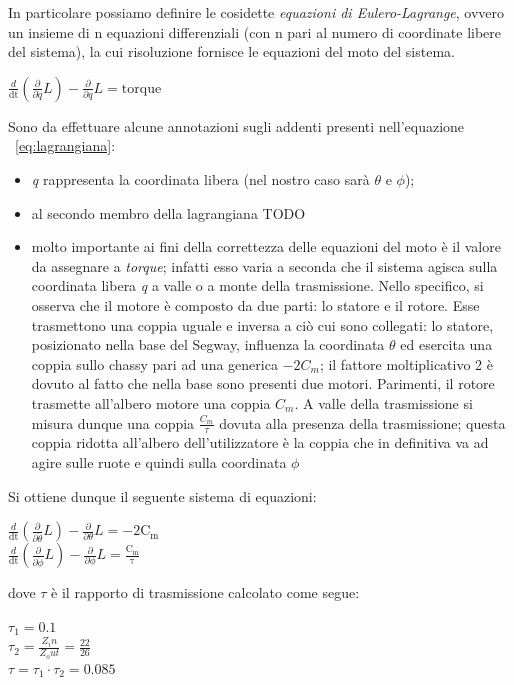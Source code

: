 In particolare possiamo definire le cosidette \textit{equazioni di Eulero-Lagrange}, ovvero un insieme di n equazioni differenziali (con n pari al numero di coordinate libere del sistema), la cui risoluzione fornisce le equazioni del moto del sistema.
\begin{center}
	\label{eq:lagrangiana}
	$\frac{d}{\mathrm{dt}}\left(\frac{\partial }{\partial \dot{q} }L\right)-\frac{\partial }{\partial q}L=\mathrm{torque}\ $
\end{center}

Sono da effettuare alcune annotazioni sugli addenti presenti nell'equazione ~\ref{eq:lagrangiana}:
\begin{itemize}
	\item \textit{q} rappresenta la coordinata libera (nel nostro caso sarà $\theta$ e $\phi$);
	\item al secondo membro della lagrangiana TODO
	\item molto importante ai fini della correttezza delle equazioni  del moto è il valore da assegnare a \textit{torque}; infatti esso varia a seconda che il sistema agisca sulla coordinata libera \textit{q} a valle o a monte della trasmissione.
	Nello specifico, si osserva che il motore è composto da due parti: lo statore e il rotore. Esse trasmettono una coppia uguale e inversa a ciò cui sono collegati: lo statore, posizionato nella base del Segway, influenza la coordinata $\theta$ ed esercita una coppia sullo chassy pari ad una generica \textit{$-2 C_m$}; il fattore moltiplicativo 2 è dovuto al fatto che nella base sono presenti due motori.
	Parimenti, il rotore trasmette all'albero motore una coppia \textit{$C_m$}. A valle della trasmissione si misura dunque una coppia \textit{$\frac{C_m}{\tau}$} dovuta alla presenza della trasmissione; questa coppia ridotta all'albero dell'utilizzatore è la coppia che in definitiva va ad agire sulle ruote e quindi sulla coordinata $\phi$
\end{itemize}
Si ottiene dunque il seguente sistema di equazioni:
\begin{center}
	\label{eq:lagrangiana_theta_phy}
	$\frac{d}{\mathrm{dt}}\left(\frac{\partial }{\partial \dot{\theta} }L\right)-\frac{\partial }{\partial \theta}L=\mathrm{-2 C_m}\ $\\
	$\frac{d}{\mathrm{dt}}\left(\frac{\partial }{\partial \dot{\phi} }L\right)-\frac{\partial }{\partial \phi}L=\mathrm{\frac{C_m}{\tau}}\ $
\end{center}
dove $\tau$ è il rapporto di trasmissione calcolato come segue:
\begin{center}
	\label{eq:tau}
	$\tau_1 = 0.1$\\
	$\tau_2 = \frac{Z_in}{Z_out} = \frac{22}{26}$\\
	$\tau = \tau_1 \cdot{\tau_2} = 0.085$	
\end{center}

